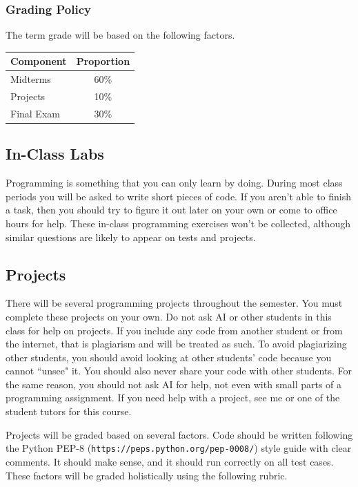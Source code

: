 \documentclass[10pt]{article}
\begin{document}
\subsubsection*{Grading Policy}

The term grade will be based on the following factors.

\begin{center}
\begin{tabular}{|l|c|}
\hline
Component      & Proportion \\ \hline
Midterms  & 60\% \\
Projects  & 10\% \\
Final Exam  & 30\% \\ \hline
\end{tabular}
\end{center}


\subsection*{In-Class Labs}
 
Programming is something that you can only learn by doing. During most class periods you will be asked to write short pieces of code. If you aren't able to finish a task, then you should try to figure it out later on your own or come to office hours for help. These in-class programming exercises won't be collected, although similar questions are likely to appear on tests and projects.


\subsection*{Projects}

There will be several programming projects throughout the semester.  You must complete these projects on your own.  Do not ask AI or other students in this class for help on projects. If you include any code from another student or from the internet, that is plagiarism and will be treated as such. To avoid plagiarizing other students, you should avoid looking at other students' code because you cannot ``unsee" it.  You should also never share your code with other students. For the same reason, you should not ask AI for help, not even with small parts of a programming assignment.  If you need help with a project, see me or one of the student tutors for this course.  

Projects will be graded based on several factors.  Code should be written following the Python PEP-8 (\verb|https://peps.python.org/pep-0008/|) style guide with clear comments.  It should make sense, and it should run correctly on all test cases.  These factors will be graded holistically using the following rubric.
\end{document}
